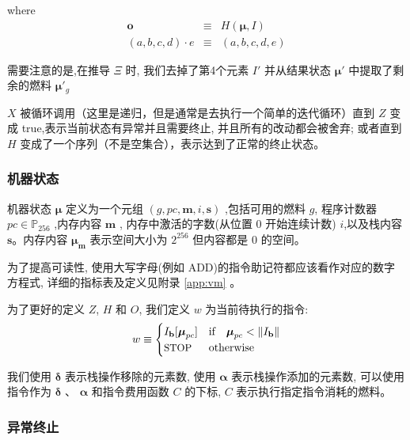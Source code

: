 \documentclass[9pt,oneside]{amsart}
\begin{document}
\begin{multicols}{2}
where
\begin{eqnarray}
\mathbf{o} & \equiv & H(\boldsymbol{\mu}, I) \\
(a, b, c, d) \cdot e & \equiv & (a, b, c, d, e)
\end{eqnarray}

需要注意的是,在推导 $\Xi$ 时, 我们去掉了第4个元素 $I'$ 并从结果状态 $\boldsymbol{\mu}'$ 中提取了剩余的燃料 $\boldsymbol{\mu}'_g$

$X$ 被循环调用（这里是递归，但是通常是去执行一个简单的迭代循环）直到 $Z$  变成 true,表示当前状态有异常并且需要终止, 并且所有的改动都会被舍弃;  或者直到 $H$ 变成了一个序列（不是空集合），表示达到了正常的终止状态。

\subsubsection{机器状态}
机器状态 $\boldsymbol{\mu}$ 定义为一个元组 $(g, pc, \mathbf{m}, i, \mathbf{s})$ ,包括可用的燃料 $g$, 程序计数器 $pc \in \mathbb{P}_{256}$ ,内存内容 $\mathbf{m}$ , 内存中激活的字数(从位置 0 开始连续计数) $i$,以及栈内容 $\mathbf{s}$。内存内容 $\boldsymbol{\mu}_\mathbf{m}$ 表示空间大小为 $2^{256}$ 但内容都是 0 的空间。

为了提高可读性, 使用大写字母(例如 {\small ADD})的指令助记符都应该看作对应的数字方程式, 详细的指标表及定义见附录 \ref{app:vm} 。

为了更好的定义 $Z$, $H$ 和 $O$, 我们定义 $w$ 为当前待执行的指令:
\begin{equation}\label{eq:currentoperation}
w \equiv \begin{cases} I_\mathbf{b}[\boldsymbol{\mu}_{pc}] & \text{if} \quad \boldsymbol{\mu}_{pc} < \lVert I_\mathbf{b} \rVert \\
\text{\small STOP} & \text{otherwise}
\end{cases}
\end{equation}

我们使用 $\mathbf{\delta}$ 表示栈操作移除的元素数, 使用 $\mathbf{\alpha}$ 表示栈操作添加的元素数, 可以使用指令作为  $\mathbf{\delta}$ 、 $\mathbf{\alpha}$ 和指令费用函数 $C$ 的下标, $C$ 表示执行指定指令消耗的燃料。

\subsubsection{异常终止}


\end{multicols}
\end{document}
